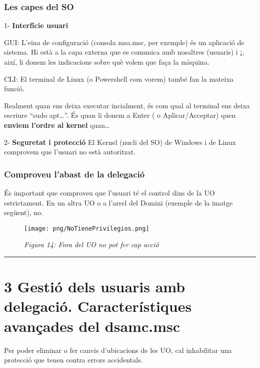 \documentclass[
  a4paper,
]{article}
\begin{document}
\subsubsection{Les capes del SO}\label{les-capes-del-so}

1- \textbf{Interfície usuari}

GUI: L'eina de configuració (consola msa.msc, per exemple) és un
aplicació de sistema. Hi està a la capa externa que es comunica amb
nosaltres (usuaris) i ¡, així, li donem les indicacions sobre què volem
que faça la màquina.

CLI: El terminal de Linux (o Powershell com vorem) també fan la mateixa
funció.

Realment quan ens deixa executar incialment, és com qual al terminal ens
deixa escriure ``sudo apt\ldots{}''. És quan li donem a Enter ( o
Aplicar/Acceptar) quen \textbf{enviem l'ordre al kernel} quan\ldots{}

2- \textbf{Seguretat i protecció} El Kernel (nucli del SO) de Windows i
de Linux comprovem que l'usuari no està autoritzat.

\subsubsection{Comproveu l'abast de la
delegació}\label{comproveu-labast-de-la-delegaciuxf3}

És important que comproveu que l'usuari té el control dins de la UO
estrictament. En un altra UO o a l'arrel del Domini (exemple de la
imatge següent), no.

\begin{figure}
\centering
\texttt{[image: png/NoTienePrivilegios.png]}
\caption{\emph{Figura 14: Fora del UO no pot fer cap acció}}
\end{figure}

\begin{center}\rule{0.5\linewidth}{0.5pt}\end{center}

\section{3 Gestió dels usuaris amb delegació. Característiques avançades
del
dsamc.msc}\label{gestiuxf3-dels-usuaris-amb-delegaciuxf3.-caracteruxedstiques-avanuxe7ades-del-dsamc.msc}

Per poder eliminar o fer canvis d'ubicacions de les UO, cal inhabilitar
una protecció que tenen contra errors accidentals.
\end{document}
